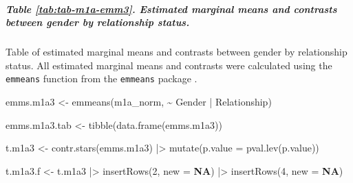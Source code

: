 \documentclass[
  bookmarksnumbered]{article}
\newenvironment{Shaded}{\begin{snugshade}}{\end{snugshade}}
\newcommand{\AttributeTok}[1]{\textcolor[rgb]{0.80,0.80,0.80}{#1}}
\newcommand{\ConstantTok}[1]{\textcolor[rgb]{0.86,0.64,0.64}{\textbf{#1}}}
\newcommand{\DecValTok}[1]{\textcolor[rgb]{0.86,0.86,0.80}{#1}}
\newcommand{\FunctionTok}[1]{\textcolor[rgb]{0.94,0.94,0.56}{#1}}
\newcommand{\NormalTok}[1]{\textcolor[rgb]{0.80,0.80,0.80}{#1}}
\newcommand{\OtherTok}[1]{\textcolor[rgb]{0.94,0.94,0.56}{#1}}
\newcommand{\SpecialCharTok}[1]{\textcolor[rgb]{0.86,0.64,0.64}{#1}}
\begin{document}
\subparagraph{Table \ref{tab:tab-m1a-emm3}. Estimated marginal means and contrasts between gender by relationship status.}\label{table-reftabtab-m1a-emm3.-estimated-marginal-means-and-contrasts-between-gender-by-relationship-status.}

Table of estimated marginal means and contrasts between gender by relationship status. All estimated marginal means and contrasts were calculated using the \texttt{emmeans} function from the \texttt{emmeans} package \autocite{emmeanscit}.

\begin{Shaded}
\begin{Highlighting}[]
\NormalTok{emms.m1a3 }\OtherTok{\textless{}{-}} \FunctionTok{emmeans}\NormalTok{(m1a\_norm, }\SpecialCharTok{\textasciitilde{}}\NormalTok{ Gender }\SpecialCharTok{|}\NormalTok{ Relationship)}

\NormalTok{emms.m1a3.tab }\OtherTok{\textless{}{-}} \FunctionTok{tibble}\NormalTok{(}\FunctionTok{data.frame}\NormalTok{(emms.m1a3))}

\NormalTok{t.m1a3 }\OtherTok{\textless{}{-}} \FunctionTok{contr.stars}\NormalTok{(emms.m1a3) }\SpecialCharTok{|\textgreater{}} 
  \FunctionTok{mutate}\NormalTok{(}\AttributeTok{p.value =} \FunctionTok{pval.lev}\NormalTok{(p.value))}

\NormalTok{t.m1a3.f }\OtherTok{\textless{}{-}}\NormalTok{ t.m1a3 }\SpecialCharTok{|\textgreater{}} 
  \FunctionTok{insertRows}\NormalTok{(}\DecValTok{2}\NormalTok{, }\AttributeTok{new =} \ConstantTok{NA}\NormalTok{) }\SpecialCharTok{|\textgreater{}}
\FunctionTok{insertRows}\NormalTok{(}\DecValTok{4}\NormalTok{, }\AttributeTok{new =} \ConstantTok{NA}\NormalTok{)}


\end{Highlighting}
\end{Shaded}
\end{document}
